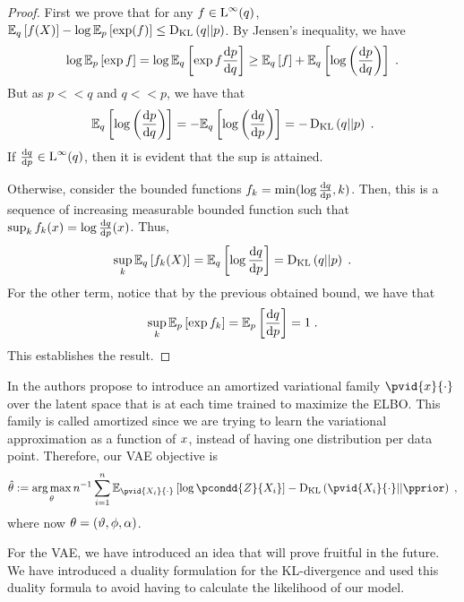 \begin{proof}
    First we prove that for any $f \in \operatorname{L}^{\infty}(q)$, $\mathbb{E}_{q}\left[f(X)\right] - \log \mathbb{E}_{p}\left[\exp(f)\right] \leq \operatorname{D}_{\operatorname{KL}}\left(q||p\right)$.
    By Jensen's inequality, we have
    \begin{equation*}
        \log \mathbb{E}_{p}\left[\exp f\right] = \log \mathbb{E}_{q}\left[\exp f \frac{\mathrm{d} p}{\mathrm{d} q}\right] \geq \mathbb{E}_{q}\left[f\right] + \mathbb{E}_{q}\left[\log\left(\frac{\mathrm{d} p}{\mathrm{d} q}\right)\right] \;.
    \end{equation*}
    But as $p << q$ and $q << p$, we have that 
    \begin{equation*}
        \mathbb{E}_{q}\left[\log\left(\frac{\mathrm{d} p}{\mathrm{d} q}\right)\right] = - \mathbb{E}_{q}\left[\log\left(\frac{\mathrm{d} q}{\mathrm{d} p}\right)\right] = - \operatorname{D}_{\operatorname{KL}}\left(q||p\right) \;. 
    \end{equation*}
    If $\frac{\mathrm{d} q}{\mathrm{d} p} \in \operatorname{L}^{\infty}(q)$, then it is evident that the sup is attained. 
    
    Otherwise, consider the bounded functions $f_k = \min(\log \frac{\mathrm{d} q}{\mathrm{d} p}, k)$. 
    Then, this is a sequence of increasing measurable bounded function such that
    $\sup_{k} f_k(x) = \log \frac{\mathrm{d} q}{\mathrm{d} p}(x)$. Thus,
    \begin{equation*}
        \sup_{k} \mathbb{E}_{q}\left[f_k(X)\right] = \mathbb{E}_{q}\left[\log \frac{\mathrm{d} q}{\mathrm{d} p}\right] = \operatorname{D}_{\operatorname{KL}}\left(q||p\right) \;.
    \end{equation*}    
    For the other term, notice that by the previous obtained bound, we have that
    \begin{equation*}
        \sup_k \mathbb{E}_{p}\left[\exp f_k\right] = \mathbb{E}_{p}\left[\frac{\mathrm{d} q}{\mathrm{d} p}\right] = 1 \;.
    \end{equation*}
    This establishes the result.
\end{proof}

In \cite{kingma2013autoencoding} the authors propose to introduce an amortized variational family
$\pvid{\lstate}{\cdot}$ over the latent space that is at each time trained to maximize the ELBO.
This family is called amortized since we are trying to learn the variational approximation as a function of $x$,
instead of having one distribution per data point. Therefore, our VAE objective is
\begin{equation}
    \label{eq:vae:objective}
    \emin{\param} \eqdef \argmax_{\param} \ndata^{-1} \sum_{i=1}^{\ndata}\PE{\pvid{\state_i}{\cdot}}{\log \pcondd{Z}{\state_i}} - \kl{\pvid{\state_i}{\cdot}}{\pprior} \eqsp,
\end{equation}
where now $\theta = (\vartheta, \phi, \alpha)$.

For the VAE, we have introduced an idea that will prove fruitful in the future. We have introduced a duality formulation
for the KL-divergence and used this duality formula to avoid having to calculate the likelihood of our model.

